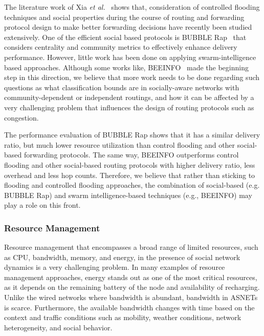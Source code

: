 The literature work of Xia {\it et al.}~\cite{FXia2013} shows that, consideration of controlled flooding techniques and social properties during the course of routing and forwarding protocol design to make better forwarding decisions have recently been studied extensively. One of the efficient social based protocols is BUBBLE Rap~\cite{PHui2011} that considers centrality and community metrics to effectively enhance delivery performance. However, little work has been done on applying swarm-intelligence based approaches. Although some works like, BEEINFO~\cite{FXia2014} made the beginning step in this direction, we believe that more work needs to be done regarding such questions as what classification bounds are in socially-aware networks with community-dependent or independent routings, and how it can be affected by a very challenging problem that influences the design of routing protocols such as congestion.

The performance evaluation of BUBBLE Rap shows that it has a similar delivery ratio, but much lower resource utilization than control flooding and other social-based forwarding protocols. The same way, BEEINFO outperforms control flooding and other social-based routing protocols with higher delivery ratio, less overhead and less hop counts. Therefore, we believe that rather than sticking to flooding and controlled flooding approaches, the combination of social-based (e.g. BUBBLE Rap) and swarm intelligence-based techniques (e.g., BEEINFO) may play a role on this front.

\subsubsection{Resource Management}\label{Chap3_02_04_03}
Resource management that encompasses a broad range of limited resources, such as CPU, bandwidth, memory, and energy, in the presence of social network dynamics is a very challenging problem. In many examples of resource management approaches, energy stands out as one of the most critical resources, as it depends on the remaining battery of the node and availability of recharging. Unlike the wired networks where bandwidth is abundant, bandwidth in ASNETs is scarce. Furthermore, the available bandwidth changes with time based on the context and traffic conditions such as mobility, weather conditions, network heterogeneity, and social behavior.

